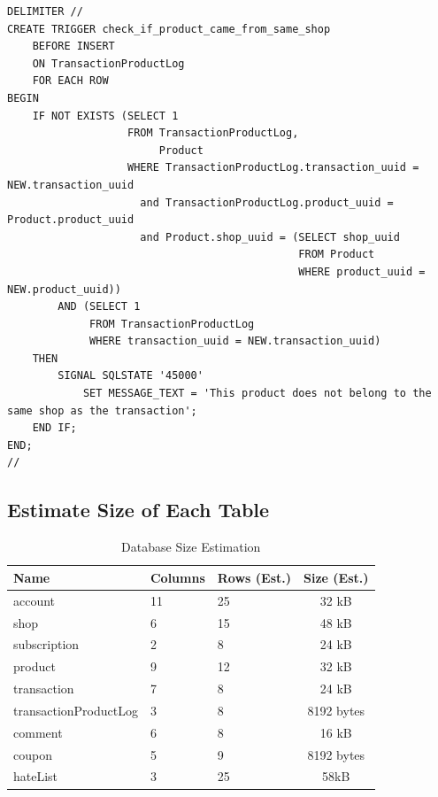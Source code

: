 \documentclass[a4paper, 12pt]{article}
\newcommand\NormalFont{\fontsize{12pt}{16pt}\selectfont}
\begin{document}
\begin{lstlisting}
DELIMITER //
CREATE TRIGGER check_if_product_came_from_same_shop
    BEFORE INSERT
    ON TransactionProductLog
    FOR EACH ROW
BEGIN
    IF NOT EXISTS (SELECT 1
                   FROM TransactionProductLog,
                        Product
                   WHERE TransactionProductLog.transaction_uuid = NEW.transaction_uuid
                     and TransactionProductLog.product_uuid = Product.product_uuid
                     and Product.shop_uuid = (SELECT shop_uuid
                                              FROM Product
                                              WHERE product_uuid = NEW.product_uuid))
        AND (SELECT 1
             FROM TransactionProductLog
             WHERE transaction_uuid = NEW.transaction_uuid)
    THEN
        SIGNAL SQLSTATE '45000'
            SET MESSAGE_TEXT = 'This product does not belong to the same shop as the transaction';
    END IF;
END;
//
\end{lstlisting}
\newpage
\NormalFont
\subsection{Estimate Size of Each Table}
\begin{table}[h]
    \renewcommand{\arraystretch}{1.35}
    \begin{tabular}{|p{5cm}|p{2cm}|p{2.5cm}|c|}
        \hline
        \textbf{Name} & \textbf{Columns} & \textbf{Rows (Est.)} & \textbf{Size (Est.)} \\
        \hline
        account & 11 & 25 & 32 kB \\
        \hline
        shop & 6 & 15 & 48 kB \\
        \hline
        subscription   & 2 & 8 & 24 kB \\
        \hline
        product & 9 & 12 & 32 kB \\
        \hline
        transaction & 7 & 8 & 24 kB \\
        \hline
        transactionProductLog & 3 & 8 & 8192 bytes \\
        \hline
        comment & 6 & 8 & 16 kB \\
        \hline
        coupon & 5 & 9 & 8192 bytes \\
        \hline
        hateList & 3 & 25 & 58kB \\
        \hline
    \end{tabular}
    \caption{Database Size Estimation}
    \label{tab:database-size-estimation}
\end{table}
\end{document}
